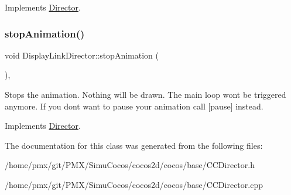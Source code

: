 Implements \hyperlink{classDirector_a122d685c783d0c2b7e2d22ba1ecb0d91}{Director}.

\mbox{\label{classDisplayLinkDirector_af3c6a2fbc71e733a9957e653c26c7798}} 
\subsubsection{\texorpdfstring{stop\+Animation()}{stopAnimation()}}
{\footnotesize\ttfamily void Display\+Link\+Director\+::stop\+Animation (\begin{DoxyParamCaption}{ }\end{DoxyParamCaption})\hspace{0.3cm}{\ttfamily [override]}, {\ttfamily [virtual]}}

Stops the animation. Nothing will be drawn. The main loop won\textquotesingle{}t be triggered anymore. If you don\textquotesingle{}t want to pause your animation call \mbox{[}pause\mbox{]} instead. 

Implements \hyperlink{classDirector_abe981a5c5d35aaf6c2aaf1b55f023e82}{Director}.



The documentation for this class was generated from the following files\+:\begin{DoxyCompactItemize}
\item 
/home/pmx/git/\+P\+M\+X/\+Simu\+Cocos/cocos2d/cocos/base/C\+C\+Director.\+h\item 
/home/pmx/git/\+P\+M\+X/\+Simu\+Cocos/cocos2d/cocos/base/C\+C\+Director.\+cpp\end{DoxyCompactItemize}
